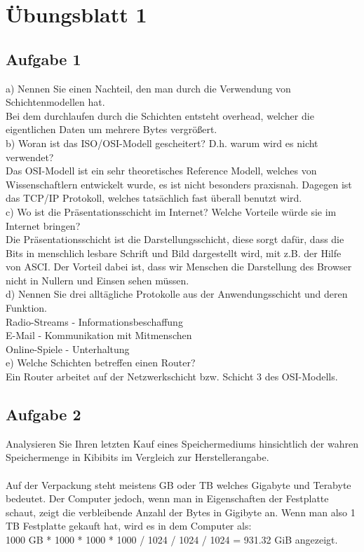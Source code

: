 \documentclass[12pt,a4paper,headsepline]{scrreprt}
\begin{document}


\section*{Übungsblatt 1}

\subsection*{Aufgabe 1}
a) Nennen Sie einen Nachteil, den man durch die Verwendung von Schichtenmodellen hat.
\\
Bei dem durchlaufen durch die Schichten entsteht overhead, welcher die eigentlichen Daten um mehrere Bytes vergrößert.
\\

b) Woran ist das ISO/OSI-Modell gescheitert? D.h. warum wird es nicht verwendet?
\\
Das OSI-Modell ist ein sehr theoretisches Reference Modell, welches von Wissenschaftlern entwickelt wurde, es ist nicht besonders praxisnah. Dagegen ist das TCP/IP Protokoll, welches tatsächlich fast überall benutzt wird.
\\

c) Wo ist die Präsentationsschicht im Internet? Welche Vorteile würde sie im Internet bringen?\\
Die Präsentationsschicht ist die Darstellungsschicht, diese sorgt dafür, dass die Bits in menschlich lesbare Schrift und Bild dargestellt wird, mit z.B. der Hilfe von ASCI. Der Vorteil dabei ist, dass wir Menschen die Darstellung des Browser nicht in Nullern und Einsen sehen müssen.
\\

d) Nennen Sie drei alltägliche Protokolle aus der Anwendungsschicht und deren Funktion.
\\
Radio-Streams - Informationsbeschaffung 
\\
E-Mail - Kommunikation mit Mitmenschen
\\
Online-Spiele - Unterhaltung
\\

e) Welche Schichten betreffen einen Router?
\\
Ein Router arbeitet auf der Netzwerkschicht bzw. Schicht 3 des OSI-Modells.

\subsection*{Aufgabe 2}
Analysieren Sie Ihren letzten Kauf eines Speichermediums hinsichtlich der wahren Speichermenge in Kibibits im Vergleich zur Herstellerangabe.
\\ \\
Auf der Verpackung steht meistens GB oder TB welches Gigabyte und Terabyte bedeutet. Der Computer jedoch, wenn man in Eigenschaften der Festplatte schaut, zeigt die verbleibende Anzahl der Bytes in Gigibyte an. Wenn man also 1 TB Festplatte gekauft hat, wird es in dem Computer als:\\ 1000 GB * 1000 * 1000 * 1000 / 1024 / 1024 / 1024 = 931.32 GiB angezeigt.
\end{document}

